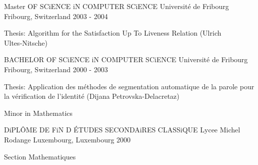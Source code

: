 

\begin{cventries}

  \cventry
    {Master OF SCiENCE iN COMPUTER SCiENCE} %
    {Université de Fribourg} %
    {Fribourg, Switzerland} %
    {2003 - 2004} %
    {
      \begin{cvitems} %
        \item {Thesis: Algorithm for the Satisfaction Up To Liveness Relation (Ulrich Ultes‑Nitsche)}
      \end{cvitems}
    }

  \cventry
    {BACHELOR OF SCiENCE iN COMPUTER SCiENCE} %
    {Université de Fribourg} %
    {Fribourg, Switzerland} %
    {2000 - 2003} %
    {
      \begin{cvitems} %
        \item {Thesis: Application des méthodes de segmentation automatique de la parole pour la vérification de l’identité (Dijana Petrovska‑Delacretaz)}
        \item {Minor in Mathematics}
      \end{cvitems}
    }

  \cventry
    {DiPLÔME DE FiN D ÉTUDES SECONDAiRES CLASSiQUE} %
    {Lycee Michel Rodange } %
    {Luxembourg, Luxembourg} %
    {2000} %
    {
      \begin{cvitems} %
        \item {Section Mathematiques}
      \end{cvitems}
    }

\end{cventries}
